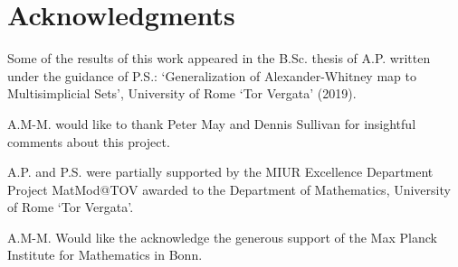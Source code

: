 
\section*{Acknowledgments}

Some of the results of this work appeared in the B.Sc. thesis of A.P. written under the guidance of P.S.: `Generalization of Alexander-Whitney map to Multisimplicial Sets', University of Rome `Tor Vergata' (2019).

A.M-M. would like to thank Peter May and Dennis Sullivan for insightful comments about this project.

A.P. and P.S. were partially supported by the MIUR Excellence Department Project MatMod@TOV awarded to the Department of Mathematics, University of Rome `Tor Vergata'.

A.M-M. Would like the acknowledge the generous support of the Max Planck Institute for Mathematics in Bonn.